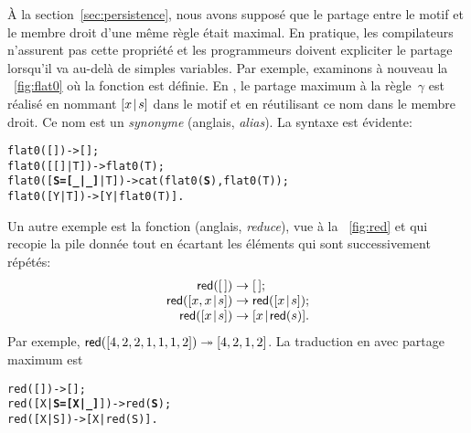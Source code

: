 À la section~\ref{sec:persistence}, nous avons supposé que le partage
entre le motif et le membre droit d'une même règle était maximal. En
pratique, les compilateurs n'assurent pas cette propriété et les
programmeurs doivent expliciter le partage lorsqu'il va au-delà de
simples variables. Par exemple, examinons à nouveau la
\fig~\vref{fig:flat0} où la fonction  est
définie. En \Erlang, le partage maximum à la règle~\(\gamma\) est
réalisé en nommant \([{x}\!\mid\!{s}]\) dans le motif et en réutilisant ce
nom dans le membre droit. Ce nom est un \emph{synonyme} (anglais,
\emph{alias}). La syntaxe est évidente:
\begin{alltt}
flat0(         []) -> [];
flat0(     [[]|T]) -> flat0(T);
flat0([\textbf{S=[\_|\_]}|T]) -> cat(flat0(\textbf{S}),flat0(T));\hfill% \emph{Synonymie}
flat0(      [Y|T]) -> [Y|flat0(T)].
\end{alltt}
  Un
autre exemple est la fonction  (anglais, \emph{reduce}),
vue à la \fig~\vref{fig:red} et qui recopie la pile donnée tout en
écartant les éléments qui sont successivement répétés:
\begin{equation*}
\begin{array}{@{}r@{\;}l@{\;}l@{}}
\fun{red}(\el)           & \rightarrow & \el;\\
\fun{red}(\cons{x,x}{s}) & \rightarrow & \fun{red}(\cons{x}{s});\\
\fun{red}(\cons{x}{s})   & \rightarrow & \cons{x}{\fun{red}(s)}.
\end{array}
\end{equation*}
Par exemple, \(\textsf{red}([4,2,2,1,1,1,2]) \twoheadrightarrow
[4,2,1,2]\). La traduction en \Erlang avec partage maximum est
\begin{alltt}
red(         []) -> [];
red([X|\textbf{S=[X|\_]}]) -> red(\textbf{S});
red(      [X|S]) -> [X|red(S)].
\end{alltt}

